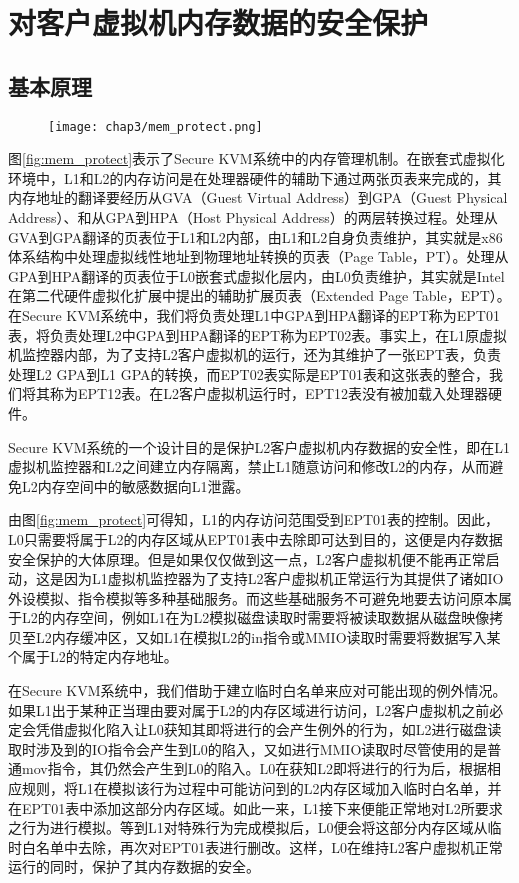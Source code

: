 \section{对客户虚拟机内存数据的安全保护}

\subsection{基本原理}

\begin{figure}[!htp]
  \centering
  \texttt{[image: chap3/mem\_protect.png]}
\end{figure}

图\ref{fig:mem_protect}表示了Secure KVM系统中的内存管理机制。在嵌套式虚拟化环境中，L1和L2的内存访问是在处理器硬件的辅助下通过两张页表来完成的，其内存地址的翻译要经历从GVA（Guest Virtual Address）到GPA（Guest Physical Address）、和从GPA到HPA（Host Physical Address）的两层转换过程。处理从GVA到GPA翻译的页表位于L1和L2内部，由L1和L2自身负责维护，其实就是x86体系结构中处理虚拟线性地址到物理地址转换的页表（Page Table，PT）。处理从GPA到HPA翻译的页表位于L0嵌套式虚拟化层内，由L0负责维护，其实就是Intel在第二代硬件虚拟化扩展中提出的辅助扩展页表（Extended Page Table，EPT）。在Secure KVM系统中，我们将负责处理L1中GPA到HPA翻译的EPT称为EPT01表，将负责处理L2中GPA到HPA翻译的EPT称为EPT02表。事实上，在L1原虚拟机监控器内部，为了支持L2客户虚拟机的运行，还为其维护了一张EPT表，负责处理L2 GPA到L1 GPA的转换，而EPT02表实际是EPT01表和这张表的整合，我们将其称为EPT12表。在L2客户虚拟机运行时，EPT12表没有被加载入处理器硬件。

Secure KVM系统的一个设计目的是保护L2客户虚拟机内存数据的安全性，即在L1虚拟机监控器和L2之间建立内存隔离，禁止L1随意访问和修改L2的内存，从而避免L2内存空间中的敏感数据向L1泄露。

由图\ref{fig:mem_protect}可得知，L1的内存访问范围受到EPT01表的控制。因此，L0只需要将属于L2的内存区域从EPT01表中去除即可达到目的，这便是内存数据安全保护的大体原理。但是如果仅仅做到这一点，L2客户虚拟机便不能再正常启动，这是因为L1虚拟机监控器为了支持L2客户虚拟机正常运行为其提供了诸如IO外设模拟、指令模拟等多种基础服务。而这些基础服务不可避免地要去访问原本属于L2的内存空间，例如L1在为L2模拟磁盘读取时需要将被读取数据从磁盘映像拷贝至L2内存缓冲区，又如L1在模拟L2的in指令或MMIO读取时需要将数据写入某个属于L2的特定内存地址。

在Secure KVM系统中，我们借助于建立临时白名单来应对可能出现的例外情况。如果L1出于某种正当理由要对属于L2的内存区域进行访问，L2客户虚拟机之前必定会凭借虚拟化陷入让L0获知其即将进行的会产生例外的行为，如L2进行磁盘读取时涉及到的IO指令会产生到L0的陷入，又如进行MMIO读取时尽管使用的是普通mov指令，其仍然会产生到L0的陷入。L0在获知L2即将进行的行为后，根据相应规则，将L1在模拟该行为过程中可能访问到的L2内存区域加入临时白名单，并在EPT01表中添加这部分内存区域。如此一来，L1接下来便能正常地对L2所要求之行为进行模拟。等到L1对特殊行为完成模拟后，L0便会将这部分内存区域从临时白名单中去除，再次对EPT01表进行删改。这样，L0在维持L2客户虚拟机正常运行的同时，保护了其内存数据的安全。

